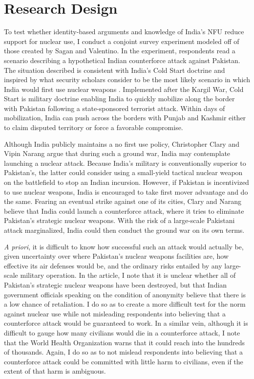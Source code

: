 \documentclass[12pt]{article}
\begin{document}
\section{Research Design}
To test whether identity-based arguments and knowledge of India's NFU reduce support for nuclear use, I conduct a conjoint survey experiment modeled off of those created by Sagan and Valentino. In the experiment, respondents read a scenario describing a hypothetical Indian counterforce attack against Pakistan. The situation described is consistent with India's Cold Start doctrine and inspired by what security scholars consider to be the most likely scenario in which India would first use nuclear weapons \citep{kapur_ten_2008, clary_indias_2019}. Implemented after the Kargil War, Cold Start is military doctrine enabling India to quickly mobilize along the border with Pakistan following a state-sponsored terrorist attack. Within days of mobilization, India can push across the borders with Punjab and Kashmir either to claim disputed territory or force a favorable compromise. 

Although India publicly maintains a no first use policy, Christopher Clary and Vipin Narang argue that during such a ground war, India may contemplate launching a nuclear attack. Because India's military is conventionally superior to Pakistan's, the latter could consider using a small-yield tactical nuclear weapon on the battlefield to stop an Indian incursion. However, if Pakistan is incentivized to use nuclear weapons, India is encouraged to take first mover advantage and do the same. Fearing an eventual strike against one of its cities, Clary and Narang believe that India could launch a counterforce attack, where it tries to eliminate Pakistan's strategic nuclear weapons. With the risk of a large-scale Pakistani attack marginalized, India could then conduct the ground war on its own terms.

\textit{A priori}, it is difficult to know how successful such an attack would actually be, given uncertainty over where Pakistan's nuclear weapons facilities are, how effective its air defenses would be, and the ordinary risks entailed by any large-scale military operation. In the article, I note that it is unclear whether all of Pakistan's strategic nuclear weapons have been destroyed, but that Indian government officials speaking on the condition of anonymity believe that there is a low chance of retaliation. I do so as to create a more difficult test for the norm against nuclear use while not misleading respondents into believing that a counterforce attack would be guaranteed to work. In a similar vein, although it is difficult to gauge how many civilians would die in a counterforce attack, I note that the World Health Organization warns that it could reach into the hundreds of thousands. Again, I do so as to not mislead respondents into believing that a counterforce attack could be committed with little harm to civilians, even if the extent of that harm is ambiguous.
\end{document}
